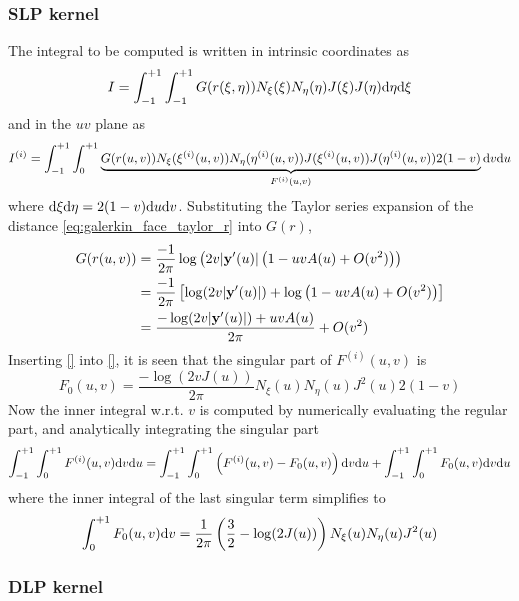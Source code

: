 \subsubsection{SLP kernel}

The integral to be computed is written in intrinsic coordinates as
%
\begin{equation}
	I = \int_{-1}^{+1}
	\int_{-1}^{+1}
	G(r(\xi,\eta)) 
	N_{\xi}(\xi) N_{\eta}(\eta) 
	J(\xi) J(\eta)
	\mathrm{d} \eta
	\mathrm{d} \xi
\end{equation}
%
and in the $uv$ plane as
%
\begin{equation}
	I^{(i)} = \int_{-1}^{+1}
	\int_{0}^{+1}
	\underbrace{G(r(u,v)) N_{\xi}(\xi^{(i)}(u,v)) N_{\eta}(\eta^{(i)}(u,v)) 
	J(\xi^{(i)}(u,v)) J(\eta^{(i)}(u,v)) 2(1-v)}_{F^{(i)}(u,v)}
	\mathrm{d} v
	\mathrm{d} u
\end{equation}
%
where $\mathrm{d}\xi \mathrm{d}\eta = 2(1-v) \mathrm{d} u \mathrm{d} v$.
Substituting the Taylor series expansion of the distance \eqref{eq:galerkin_face_taylor_r} into $G(r)$, 
%
\begin{align}
	G(r(u,v)) 
	&= \frac{-1}{2\pi} \log\left(2v|{\bf y}'(u)| \left(1 - u v A(u) + O(v^2) \right)\right) \\
	&= \frac{-1}{2\pi} \left[ 
	\log(2v|{\bf y}'(u)| )
	+
	\log \left(1 - u v A(u) + O(v^2) \right)
	\right] \\
	&= \frac{-\log(2v|{\bf y}'(u)| )
	+
	u v A(u)
	}{2\pi} 
	 + O(v^2)
\end{align}
%
Inserting \eqref{} into \eqref{}, it is seen that the singular part of $F^{(i)}(u,v)$ is
%
\begin{equation}
	F_0(u,v) = \frac{-\log(2v J(u) )}{2\pi} 
	N_{\xi}(u) N_{\eta}(u) 
	J^2(u) 2(1-v)
\end{equation}
%
Now the inner integral w.r.t. $v$ is computed by numerically evaluating the regular part, and analytically integrating the singular part
%
\begin{equation}
	\int_{-1}^{+1} \int_{0}^{+1} F^{(i)}(u,v) \mathrm{d} v \mathrm{d} u
	= 
	\int_{-1}^{+1} \int_{0}^{+1} \left( F^{(i)}(u,v) - F_0(u,v) \right) \mathrm{d} v \mathrm{d} u
	+
	\int_{-1}^{+1} \int_{0}^{+1} F_0(u,v) \mathrm{d} v \mathrm{d} u
\end{equation}
%
where the inner integral of the last singular term simplifies to
%
\begin{equation}
	\int_{0}^{+1} F_0(u,v) \mathrm{d} v = \frac{1}{2\pi} \left(\frac{3}{2} - \log(2 J(u)) \right) N_{\xi}(u) N_{\eta}(u) 
	J^2(u)
\end{equation}

\subsubsection{DLP kernel}


